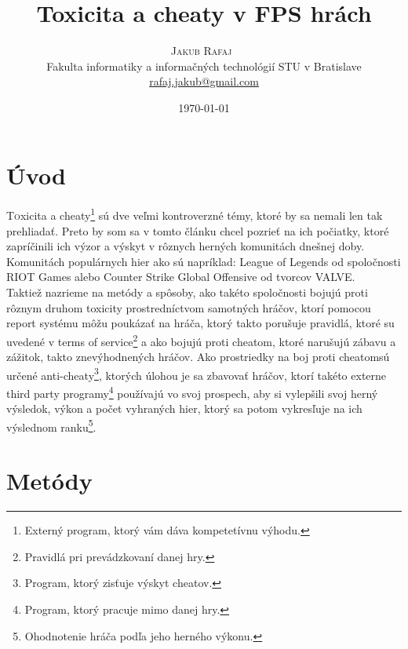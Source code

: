 \documentclass[twoside,twocolumn]{article}
\title{Toxicita a cheaty v FPS hrách} %
\author{%
\textsc{Jakub Rafaj}\
\\[1ex]
\normalsize Fakulta informatiky a informačných technológií STU v Bratislave  \\%
\normalsize \href{mailto:rafaj.jakub@gmail.com}{rafaj.jakub@gmail.com} %
}
\date{\today} %
\begin{document}
\maketitle

\tableofcontents
\section{Úvod}

\lettrine[nindent=0em,lines=3]{T}oxicita a cheaty\footnote[1]{Externý program, ktorý vám dáva kompetetívnu výhodu.} sú dve veľmi kontroverzné témy, ktoré by sa nemali len tak prehliadať. Preto by som sa v tomto článku chcel pozrieť na ich počiatky, ktoré zapríčinili ich výzor a výskyt v rôznych herných komunitách dnešnej doby. Komunitách populárnych hier ako sú napríklad: League of Legends od spoločnosti RIOT Games alebo Counter Strike Global Offensive od tvorcov VALVE.\\
Taktiež nazrieme na metódy a spôsoby, ako takéto spoločnosti bojujú proti rôznym druhom toxicity prostredníctvom samotných hráčov, ktorí pomocou report systému môžu poukázať na hráča, ktorý takto porušuje pravidlá, ktoré su uvedené v terms of service\footnote[2]{Pravidlá pri prevádzkovaní danej hry.} a ako bojujú proti cheatom\footnotemark[1], ktoré narušujú zábavu a zážitok, takto znevýhodnených hráčov. Ako prostriedky na boj proti cheatom\footnotemark[1] sú určené anti-cheaty\footnote[3]{Program, ktorý zisťuje výskyt cheatov.}, ktorých úlohou je sa zbavovať hráčov, ktorí takéto externe third party programy\footnote[4]{Program, ktorý pracuje mimo danej hry.} používajú vo svoj prospech, aby si vylepšili svoj herný výsledok, výkon a počet vyhraných hier, ktorý sa potom vykresľuje na ich výslednom ranku\footnote[5]{Ohodnotenie hráča podľa jeho herného výkonu.}.\\


\section{Metódy}
\end{document}
